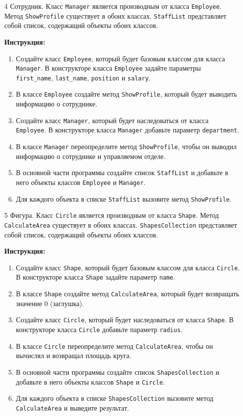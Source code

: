\begin{enumerate}
\item[4]
Сотрудник. Класс \texttt{Manager} является производным от класса \texttt{Employee}. Метод \texttt{ShowProfile} существует в обоих классах. \texttt{StaffList} представляет собой список, содержащий объекты обоих классов.

\textbf{Инструкция:}
\begin{enumerate}
    \item Создайте класс \texttt{Employee}, который будет базовым классом для класса \texttt{Manager}. В конструкторе класса \texttt{Employee} задайте параметры \texttt{first\_name}, \texttt{last\_name}, \texttt{position} и \texttt{salary}.
    \item В классе \texttt{Employee} создайте метод \texttt{ShowProfile}, который будет выводить информацию о сотруднике.
    \item Создайте класс \texttt{Manager}, который будет наследоваться от класса \texttt{Employee}. В конструкторе класса \texttt{Manager} добавьте параметр \texttt{department}.
    \item В классе \texttt{Manager} переопределите метод \texttt{ShowProfile}, чтобы он выводил информацию о сотруднике и управляемом отделе.
    \item В основной части программы создайте список \texttt{StaffList} и добавьте в него объекты классов \texttt{Employee} и \texttt{Manager}.
    \item Для каждого объекта в списке \texttt{StaffList} вызовите метод \texttt{ShowProfile}.
\end{enumerate}

\item[5]
Фигура. Класс \texttt{Circle} является производным от класса \texttt{Shape}. Метод \texttt{CalculateArea} существует в обоих классах. \texttt{ShapesCollection} представляет собой список, содержащий объекты обоих классов.

\textbf{Инструкция:}
\begin{enumerate}
    \item Создайте класс \texttt{Shape}, который будет базовым классом для класса \texttt{Circle}. В конструкторе класса \texttt{Shape} задайте параметр \texttt{name}.
    \item В классе \texttt{Shape} создайте метод \texttt{CalculateArea}, который будет возвращать значение 0 (заглушка).
    \item Создайте класс \texttt{Circle}, который будет наследоваться от класса \texttt{Shape}. В конструкторе класса \texttt{Circle} добавьте параметр \texttt{radius}.
    \item В классе \texttt{Circle} переопределите метод \texttt{CalculateArea}, чтобы он вычислял и возвращал площадь круга.
    \item В основной части программы создайте список \texttt{ShapesCollection} и добавьте в него объекты классов \texttt{Shape} и \texttt{Circle}.
    \item Для каждого объекта в списке \texttt{ShapesCollection} вызовите метод \texttt{CalculateArea} и выведите результат.
\end{enumerate}


\end{enumerate}
